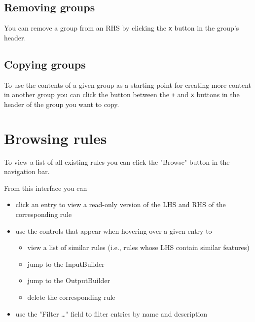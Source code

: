 \documentclass[11pt]{article}
\begin{document}
\subsection{Removing groups}
\label{sec-19-2}
You can remove a group from an RHS by clicking the \texttt{x} button in
the group's header.

\subsection{Copying groups}
\label{sec-19-3}
To use the contents of a given group as a starting point for
creating more content in another group you can click the button
between the \texttt{+} and \texttt{x} buttons in the header of the group you want
to copy.

\section{Browsing rules}
\label{sec-20}
To view a list of all existing rules you can click the "Browse"
button in the navigation bar.

From this interface you can

\begin{itemize}
\item click an entry to view a read-only version of the LHS and RHS of
the corresponding rule
\item use the controls that appear when hovering over a given entry to
\begin{itemize}
\item view a list of similar rules (i.e., rules whose LHS contain
similar features)
\item jump to the InputBuilder
\item jump to the OutputBuilder
\item delete the corresponding rule
\end{itemize}
\item use the "Filter \ldots{}" field to filter entries by name and
description
\end{itemize}
\end{document}
